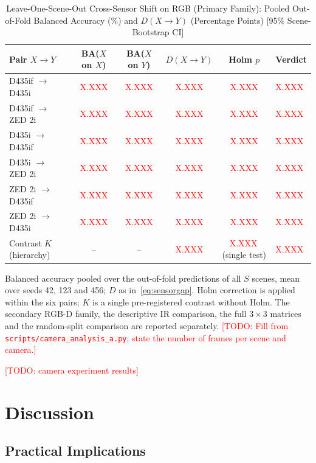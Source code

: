 \documentclass[journal]{IEEEtran}
\newcommand{\todo}[1]{\textcolor{red}{[TODO: #1]}}
\newcommand{\PHs}{\textcolor{red}{X.XXX}}
\begin{document}
\begin{table}[t]
\centering
\caption{Leave-One-Scene-Out Cross-Sensor Shift on RGB (Primary Family): Pooled Out-of-Fold Balanced Accuracy (\%) and $D(X\rightarrow Y)$ (Percentage Points) [95\% Scene-Bootstrap CI]}
\label{tab:loso}
\begin{tabular}{@{}lccccl@{}}
\toprule
\textbf{Pair $X \rightarrow Y$} & \textbf{BA($X$ on $X$)} & \textbf{BA($X$ on $Y$)} & \textbf{$D(X\rightarrow Y)$} & \textbf{Holm $p$} & \textbf{Verdict} \\
\midrule
D435if $\rightarrow$ D435i  & \PHs & \PHs & \PHs & \PHs & \PHs \\
D435if $\rightarrow$ ZED 2i & \PHs & \PHs & \PHs & \PHs & \PHs \\
D435i $\rightarrow$ D435if  & \PHs & \PHs & \PHs & \PHs & \PHs \\
D435i $\rightarrow$ ZED 2i  & \PHs & \PHs & \PHs & \PHs & \PHs \\
ZED 2i $\rightarrow$ D435if & \PHs & \PHs & \PHs & \PHs & \PHs \\
ZED 2i $\rightarrow$ D435i  & \PHs & \PHs & \PHs & \PHs & \PHs \\
\midrule
Contrast $K$ (hierarchy)    & --   & --   & \PHs & \PHs\,(single test) & \PHs \\
\bottomrule
\end{tabular}
\vspace{2pt}
\parbox{\textwidth}{\footnotesize Balanced accuracy pooled over the out-of-fold predictions of all $S$ scenes, mean over seeds 42, 123 and 456; $D$ as in~\eqref{eq:sensorgap}. Holm correction is applied within the six pairs; $K$ is a single pre-registered contrast without Holm. The secondary RGB-D family, the descriptive IR comparison, the full $3\times3$ matrices and the random-split comparison are reported separately. \todo{Fill from \texttt{scripts/camera\_analysis\_a.py}; state the number of frames per scene and camera.}}
\end{table}

\todo{camera experiment results}


\section{Discussion}
\label{sec:discussion}

\subsection{Practical Implications}
\end{document}
